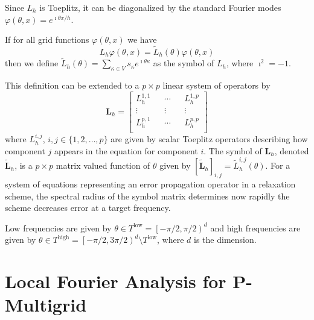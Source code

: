 \documentclass[review]{siamart190516}
\begin{document}
Since $L_h$ is Toeplitz, it can be diagonalized by the standard Fourier modes $\varphi \left( \theta, x \right) = e^{\imath \theta x / h}$.

\begin{definition}[Symbol of $L_h$]\label{def:symbol}
If for all grid functions $\varphi \left( \theta, x \right)$ we have
\begin{equation}
L_h \varphi \left( \theta, x \right) = \tilde{L}_h \left( \theta \right) \varphi \left( \theta, x \right)
\end{equation}
then we define $\tilde{L}_h \left( \theta \right) = \sum_{\kappa \in V} s_\kappa e^{\imath \theta \kappa}$ as the symbol of $L_h$, where $\imath^2 = -1$.
\end{definition}

This definition can be extended to a $p \times p$ linear system of operators by
\begin{equation}
\mathbf{L}_h =
\begin{bmatrix}
    L_h^{1, 1} && \cdots && L_h^{1, p}        \\
    \vdots               && \vdots && \vdots  \\
    L_h^{p, 1} && \cdots && L_h^{p, p}        \\
\end{bmatrix}
\end{equation}
where $L_h^{i, j}$, $i, j \in \lbrace 1, 2, \dots, p \rbrace$ are given by scalar Toeplitz operators describing how component $j$ appears in the equation for component $i$.
The symbol of $\mathbf{L}_h$, denoted $\tilde{\mathbf{L}}_h$, is a $p \times p$ matrix valued function of $\theta$ given by $\left[ \tilde{\mathbf{L}}_h \right]_{i, j} = \tilde{L}_h^{i, j} \left( \theta \right)$.
For a system of equations representing an error propagation operator in a relaxation scheme, the spectral radius of the symbol matrix determines now rapidly the scheme decreases error at a target frequency.

Low frequencies are given by $\theta \in T^{\text{low}} = \left[ - \pi / 2, \pi / 2 \right)^d$ and high frequencies are given by $\theta \in T^{\text{high}} = \left[ - \pi / 2, 3 \pi / 2 \right)^d \setminus T^{\text{low}}$, where $d$ is the dimension.

\section{Local Fourier Analysis for P-Multigrid}\label{sec:lfa}
\end{document}
